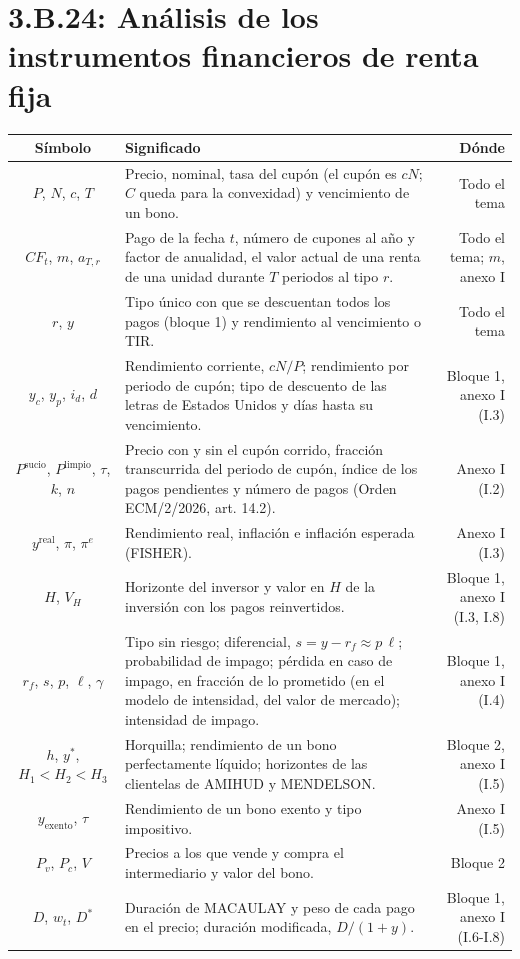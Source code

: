 \documentclass[10pt,a4paper]{article}
\newcommand{\cabecera}{\toprule\textbf{Símbolo} & \textbf{Significado} & \textbf{Dónde}\\\midrule\endhead\bottomrule\endfoot}
\begin{document}
\section{3.B.24: Análisis de los instrumentos financieros de renta fija}
\begin{longtable}{SMD}
\cabecera
$P$, $N$, $c$, $T$ & Precio, nominal, tasa del cupón (el cupón es $cN$; $C$ queda para la convexidad) y vencimiento de un bono. & Todo el tema\\
$CF_t$, $m$, $a_{T,r}$ & Pago de la fecha $t$, número de cupones al año y factor de anualidad, el valor actual de una renta de una unidad durante $T$ periodos al tipo $r$. & Todo el tema; $m$, anexo I\\
$r$, $y$ & Tipo único con que se descuentan todos los pagos (bloque 1) y rendimiento al vencimiento o TIR. & Todo el tema\\
$y_c$, $y_p$, $i_d$, $d$ & Rendimiento corriente, $cN/P$; rendimiento por periodo de cupón; tipo de descuento de las letras de Estados Unidos y días hasta su vencimiento. & Bloque 1, anexo I (I.3)\\
$P^{\text{sucio}}$, $P^{\text{limpio}}$, $\tau$, $k$, $n$ & Precio con y sin el cupón corrido, fracción transcurrida del periodo de cupón, índice de los pagos pendientes y número de pagos (Orden ECM/2/2026, art. 14.2). & Anexo I (I.2)\\
$y^{\text{real}}$, $\pi$, $\pi^e$ & Rendimiento real, inflación e inflación esperada (FISHER). & Anexo I (I.3)\\
$H$, $V_H$ & Horizonte del inversor y valor en $H$ de la inversión con los pagos reinvertidos. & Bloque 1, anexo I (I.3, I.8)\\
$r_f$, $s$, $p$, $\ell$, $\gamma$ & Tipo sin riesgo; diferencial, $s=y-r_f\approx p\,\ell$; probabilidad de impago; pérdida en caso de impago, en fracción de lo prometido (en el modelo de intensidad, del valor de mercado); intensidad de impago. & Bloque 1, anexo I (I.4)\\
$h$, $y^*$, $H_1<H_2<H_3$ & Horquilla; rendimiento de un bono perfectamente líquido; horizontes de las clientelas de AMIHUD y MENDELSON. & Bloque 2, anexo I (I.5)\\
$y_{\text{exento}}$, $\tau$ & Rendimiento de un bono exento y tipo impositivo. & Anexo I (I.5)\\
$P_v$, $P_c$, $V$ & Precios a los que vende y compra el intermediario y valor del bono. & Bloque 2\\
$D$, $w_t$, $D^*$ & Duración de MACAULAY y peso de cada pago en el precio; duración modificada, $D/(1+y)$. & Bloque 1, anexo I (I.6-I.8)\\

\end{longtable}
\end{document}
